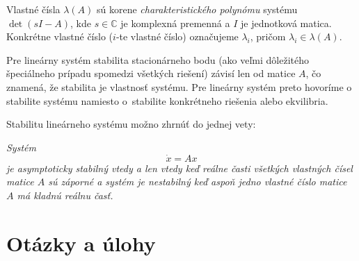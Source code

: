 \documentclass[a4paper, 10pt, ]{article}
\begin{document}
Vlastné čísla $\lambda(A)$ sú korene \emph{charakteristického polynómu} systému $\det(sI - A)$, kde $s \in \mathbb{C}$ je komplexná premenná a $I$ je jednotková matica. Konkrétne vlastné číslo ($i$-te vlastné číslo) označujeme $\lambda_i$, pričom $\lambda_i \in \lambda(A)$.

Pre lineárny systém stabilita stacionárneho bodu (ako veľmi dôležitého špeciálneho prípadu spomedzi všetkých riešení) závisí len od matice $A$, čo znamená, že stabilita je vlastnosť systému. Pre lineárny systém preto hovoríme o stabilite systému namiesto o~stabilite konkrétneho riešenia alebo ekvilibria.

Stabilitu lineárneho systému možno zhrnúť do jednej vety:

{ \it
\noindent
Systém
\begin{equation*}
	\dot{x} = A x
\end{equation*}
je asymptoticky stabilný vtedy a len vtedy keď reálne časti všetkých vlastných čísel matice $A$ sú záporné a systém je nestabilný keď aspoň jedno vlastné číslo matice $A$ má kladnú reálnu časť.
}



























\section{Otázky a úlohy}
\end{document}
